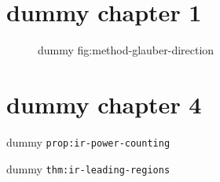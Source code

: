 \clearpage\begingroup\small
\setcounter{chapter}{1}\addtocounter{chapter}{-1}
\chapter{dummy chapter 1}
\begin{figure}[h]\centering{}\caption{dummy fig:method-glauber-direction}\label{fig:method-glauber-direction}\end{figure}
\setcounter{chapter}{4}\addtocounter{chapter}{-1}
\chapter{dummy chapter 4}
\begin{proposition}\label{prop:ir-power-counting}dummy \texttt{prop:ir-power-counting}\end{proposition}
\begin{theorem}\label{thm:ir-leading-regions}dummy \texttt{thm:ir-leading-regions}\end{theorem}
\setcounter{chapter}{9}\addtocounter{chapter}{-1}
